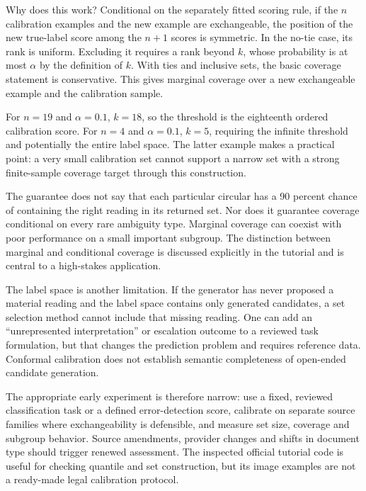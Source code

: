 Why does this work? Conditional on the separately fitted scoring rule, if the
$n$ calibration examples and the new example are exchangeable, the position of
the new true-label score among the $n+1$ scores is symmetric. In the no-tie case,
its rank is uniform. Excluding it requires a rank beyond $k$, whose probability
is at most $\alpha$ by the definition of $k$. With ties and inclusive sets, the
basic coverage statement is conservative. This gives marginal coverage over a
new exchangeable example and the calibration sample.


For $n=19$ and $\alpha=0.1$, $k=18$, so the threshold is the eighteenth ordered
calibration score. For $n=4$ and $\alpha=0.1$, $k=5$, requiring the infinite
threshold and potentially the entire label space. The latter example makes a
practical point: a very small calibration set cannot support a narrow set with a
strong finite-sample coverage target through this construction.

The guarantee does not say that each particular circular has a 90 percent chance
of containing the right reading in its returned set. Nor does it guarantee
coverage conditional on every rare ambiguity type. Marginal coverage can coexist
with poor performance on a small important subgroup. The distinction between
marginal and conditional coverage is discussed explicitly in the tutorial
\citep[section 3]{conformal2022} and is central to a high-stakes application.

The label space is another limitation. If the generator has never proposed a
material reading and the label space contains only generated candidates, a set
selection method cannot include that missing reading. One can add an
``unrepresented interpretation'' or escalation outcome to a reviewed task
formulation, but that changes the prediction problem and requires reference data.
Conformal calibration does not establish semantic completeness of open-ended
candidate generation.

The appropriate early experiment is therefore narrow: use a fixed, reviewed
classification task or a defined error-detection score, calibrate on separate
source families where exchangeability is defensible, and measure set size,
coverage and subgroup behavior. Source amendments, provider changes and shifts in
document type should trigger renewed assessment. The inspected official tutorial
code is useful for checking quantile and set construction, but its image examples
are not a ready-made legal calibration protocol.

